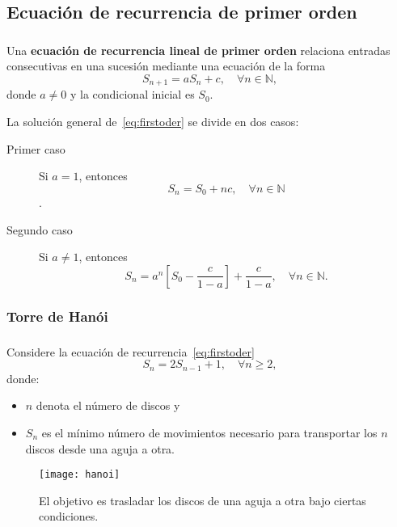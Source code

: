 \subsection{Ecuación de recurrencia de primer orden}

\begin{frame}
\frametitle{\subsecname}

\begin{definition}
	Una \textbf{ecuación de recurrencia lineal de primer orden} relaciona entradas consecutivas en una sucesión mediante una ecuación de la forma
	\begin{equation}\label{eq:firstoder}
		S_{n+1}=aS_{n}+c,\quad\forall n\in\mathds{N},
	\end{equation}
	donde $a\neq0$ y la condicional inicial es $S_{0}$.
\end{definition}

\begin{claim}
	La solución general de~\eqref{eq:firstoder} se divide en dos casos:
	\begin{description}
		\item[Primer caso] Si $a=1$, entonces  \[ S_{n}= S_{0}+nc,\quad\forall n\in\mathds{N} \].
		\item[Segundo caso] Si $a\neq1$, entonces \[ S_{n}=a^{n}\left[S_{0}-\frac{c}{1-a}\right]+\frac{c}{1-a},\quad\forall n\in\mathds{N}. \]
	\end{description}
\end{claim}
\end{frame}

\subsubsection{Torre de Hanói}

\begin{frame}
\frametitle{\subsubsecname}

\begin{minipage}{0.45\paperwidth}
Considere la ecuación de recurrencia~\eqref{eq:firstoder} \[ S_{n}=2S_{n-1}+1,\quad\forall n\geq2, \] donde:
\begin{itemize}
	\item $n$ denota el número de discos y
	\item $S_{n}$ es el mínimo número de movimientos necesario para transportar los $n$ discos desde una aguja a otra.
\end{itemize}
\end{minipage}
\hfill
\begin{minipage}{0.45\paperwidth}
	\begin{figure}[H]
		\centering
		\texttt{[image: hanoi]}
		\caption{El objetivo es trasladar los discos de una aguja a otra bajo ciertas condiciones.}
	\end{figure}
\end{minipage}
\end{frame}

